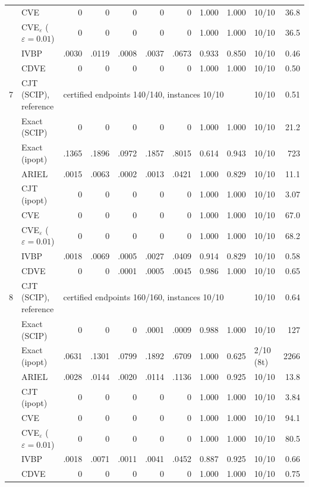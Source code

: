 \begin{table}[htbp]
\begin{tabular}{rlrrrrrrrlr}
 & CVE & 0 & 0 & 0 & 0 & 0 & 1.000 & 1.000 & 10/10 & 36.8 \\
 & CVE$_\varepsilon$ ($\varepsilon{=}0.01$) & 0 & 0 & 0 & 0 & 0 & 1.000 & 1.000 & 10/10 & 36.5 \\
 & IVBP & .0030 & .0119 & .0008 & .0037 & .0673 & 0.933 & 0.850 & 10/10 & 0.46 \\
 & CDVE & 0 & 0 & 0 & 0 & 0 & 1.000 & 1.000 & 10/10 & 0.50 \\
\midrule
7 & CJT (SCIP), reference & \multicolumn{7}{l}{certified endpoints 140/140, instances 10/10} & 10/10 & 0.51 \\
 & Exact (SCIP) & 0 & 0 & 0 & 0 & 0 & 1.000 & 1.000 & 10/10 & 21.2 \\
 & Exact (ipopt) & .1365 & .1896 & .0972 & .1857 & .8015 & 0.614 & 0.943 & 10/10 & 723 \\
 & ARIEL & .0015 & .0063 & .0002 & .0013 & .0421 & 1.000 & 0.829 & 10/10 & 11.1 \\
 & CJT (ipopt) & 0 & 0 & 0 & 0 & 0 & 1.000 & 1.000 & 10/10 & 3.07 \\
 & CVE & 0 & 0 & 0 & 0 & 0 & 1.000 & 1.000 & 10/10 & 67.0 \\
 & CVE$_\varepsilon$ ($\varepsilon{=}0.01$) & 0 & 0 & 0 & 0 & 0 & 1.000 & 1.000 & 10/10 & 68.2 \\
 & IVBP & .0018 & .0069 & .0005 & .0027 & .0409 & 0.914 & 0.829 & 10/10 & 0.58 \\
 & CDVE & 0 & 0 & .0001 & .0005 & .0045 & 0.986 & 1.000 & 10/10 & 0.65 \\
\midrule
8 & CJT (SCIP), reference & \multicolumn{7}{l}{certified endpoints 160/160, instances 10/10} & 10/10 & 0.64 \\
 & Exact (SCIP) & 0 & 0 & 0 & .0001 & .0009 & 0.988 & 1.000 & 10/10 & 127 \\
 & Exact (ipopt) & .0631 & .1301 & .0799 & .1892 & .6709 & 1.000 & 0.625 & 2/10 (8t) & 2266 \\
 & ARIEL & .0028 & .0144 & .0020 & .0114 & .1136 & 1.000 & 0.925 & 10/10 & 13.8 \\
 & CJT (ipopt) & 0 & 0 & 0 & 0 & 0 & 1.000 & 1.000 & 10/10 & 3.84 \\
 & CVE & 0 & 0 & 0 & 0 & 0 & 1.000 & 1.000 & 10/10 & 94.1 \\
 & CVE$_\varepsilon$ ($\varepsilon{=}0.01$) & 0 & 0 & 0 & 0 & 0 & 1.000 & 1.000 & 10/10 & 80.5 \\
 & IVBP & .0018 & .0071 & .0011 & .0041 & .0452 & 0.887 & 0.925 & 10/10 & 0.66 \\
 & CDVE & 0 & 0 & 0 & 0 & 0 & 1.000 & 1.000 & 10/10 & 0.75 \\

\end{tabular}
\end{table}
